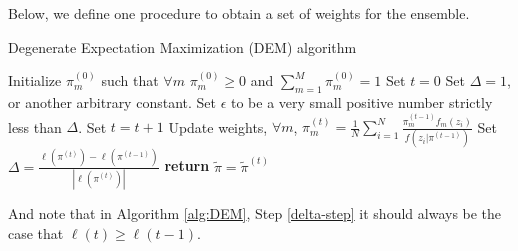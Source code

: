 \documentclass{article}
\begin{document}
Below, we define one procedure to obtain a set of weights for the ensemble.

\begin{algorithm}
\caption{Degenerate Expectation Maximization (DEM) algorithm}\label{alg:DEM}
\begin{algorithmic}[1]
\State Initialize $\pi_m^{(0)}$ such that $\forall m$ $\pi_m^{(0)} \geq 0$ and $\sum_{m=1}^M \pi_m^{(0)}=1$ 
\State Set $t=0$
\State Set $\Delta=1$, or another arbitrary constant.
\State Set $\epsilon$ to be a very small positive number strictly less than $\Delta$.
\While{$ \Delta > \epsilon$}%
\State Set $t=t+1$
\State Update weights, $\forall m$, $\pi_m^{(t)} = \frac{1}{N}\sum_{i=1}^N \frac{\pi_m^{(t-1)}f_m(z_i)}{f(z_i|\pi^{(t-1)})}$
\State Set $\Delta =  \frac{\ell(\pi^{(t)}) - \ell(\pi^{(t-1)})}{|\ell(\pi^{(t)})|}$ \label{delta-step}
\EndWhile
\State \textbf{return} $\tilde\pi = \tilde\pi^{(t)}$%
\EndProcedure
\end{algorithmic}
\end{algorithm}

And note that in Algorithm \ref{alg:DEM}, Step \ref{delta-step} it should always be the case that $\ell(t) \geq \ell(t-1)$.
\end{document}
